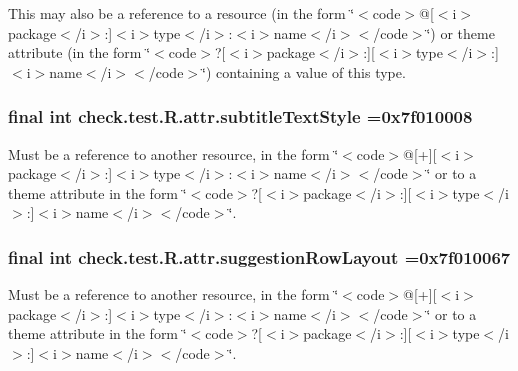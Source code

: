 This may also be a reference to a resource (in the form \char`\"{}$<$code$>$@\mbox{[}$<$i$>$package$<$/i$>$\+:\mbox{]}$<$i$>$type$<$/i$>$\+:$<$i$>$name$<$/i$>$$<$/code$>$\char`\"{}) or theme attribute (in the form \char`\"{}$<$code$>$?\mbox{[}$<$i$>$package$<$/i$>$\+:\mbox{]}\mbox{[}$<$i$>$type$<$/i$>$\+:\mbox{]}$<$i$>$name$<$/i$>$$<$/code$>$\char`\"{}) containing a value of this type. \hypertarget{classcheck_1_1test_1_1_r_1_1attr_a9cca12a24b4e55c67ec8573d8aca9d25}{}
\subsubsection[{subtitle\+Text\+Style}]{\setlength{\rightskip}{0pt plus 5cm}final int check.\+test.\+R.\+attr.\+subtitle\+Text\+Style =0x7f010008\hspace{0.3cm}{\ttfamily [static]}}\label{classcheck_1_1test_1_1_r_1_1attr_a9cca12a24b4e55c67ec8573d8aca9d25}
Must be a reference to another resource, in the form \char`\"{}$<$code$>$@\mbox{[}+\mbox{]}\mbox{[}$<$i$>$package$<$/i$>$\+:\mbox{]}$<$i$>$type$<$/i$>$\+:$<$i$>$name$<$/i$>$$<$/code$>$\char`\"{} or to a theme attribute in the form \char`\"{}$<$code$>$?\mbox{[}$<$i$>$package$<$/i$>$\+:\mbox{]}\mbox{[}$<$i$>$type$<$/i$>$\+:\mbox{]}$<$i$>$name$<$/i$>$$<$/code$>$\char`\"{}. \hypertarget{classcheck_1_1test_1_1_r_1_1attr_aa1d2db971e8289c75a03c38ae25812e1}{}
\subsubsection[{suggestion\+Row\+Layout}]{\setlength{\rightskip}{0pt plus 5cm}final int check.\+test.\+R.\+attr.\+suggestion\+Row\+Layout =0x7f010067\hspace{0.3cm}{\ttfamily [static]}}\label{classcheck_1_1test_1_1_r_1_1attr_aa1d2db971e8289c75a03c38ae25812e1}
Must be a reference to another resource, in the form \char`\"{}$<$code$>$@\mbox{[}+\mbox{]}\mbox{[}$<$i$>$package$<$/i$>$\+:\mbox{]}$<$i$>$type$<$/i$>$\+:$<$i$>$name$<$/i$>$$<$/code$>$\char`\"{} or to a theme attribute in the form \char`\"{}$<$code$>$?\mbox{[}$<$i$>$package$<$/i$>$\+:\mbox{]}\mbox{[}$<$i$>$type$<$/i$>$\+:\mbox{]}$<$i$>$name$<$/i$>$$<$/code$>$\char`\"{}. \hypertarget{classcheck_1_1test_1_1_r_1_1attr_aab06ab49d50f5d3f49bf75148054587f}{}
